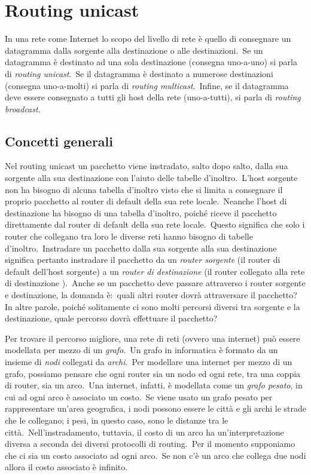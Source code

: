 \section{Routing unicast}

In una rete come Internet lo scopo del livello di rete è quello di consegnare un datagramma dalla sorgente alla destinazione o alle destinazioni.\
Se un datagramma è destinato ad una sola destinazione (consegna uno-a-uno) si parla di \emph{routing unicast}.\
Se il datagramma è destinato a numerose destinazioni (consegna uno-a-molti) si parla di \emph{routing multicast}.\
Infine, se il datagramma deve essere consegnato a tutti gli host della rete (uno-a-tutti), si parla di \emph{routing broadcast}.

\subsection{Concetti generali}

Nel routing unicast un pacchetto viene instradato, salto dopo salto, dalla sua sorgente alla sua destinazione con l'aiuto delle tabelle d'inoltro.\
L'host sorgente non ha bisogno di alcuna tabella d'inoltro visto che si limita a consegnare il proprio pacchetto al router di default della sua rete locale.\
Neanche l'host di destinazione ha bisogno di una tabella d'inoltro, poiché riceve il pacchetto direttamente dal router di default della sua rete locale.\
Questo significa che solo i router che collegano tra loro le diverse reti hanno bisogno di tabelle d'inoltro.\
Instradare un pacchetto dalla sua sorgente alla sua destinazione significa pertanto instradare il pacchetto da un \emph{router sorgente} (il router di default dell'host sorgente) a un \emph{router di destinazione} (il router collegato alla rete di destinazione ).\
Anche se un pacchetto deve passare attraverso i router sorgente e destinazione, la domanda è:\ quali altri router dovrà attraversare il pacchetto? In altre parole, poiché solitamente ci sono molti percorsi diversi tra sorgente e la destinazione, quale percorso dovrà effettuare il pacchetto?

Per trovare il percorso migliore, una rete di reti (ovvero una internet) può essere modellata per mezzo di un \emph{grafo}.\
Un grafo in informatica è formato da un insieme di \emph{nodi} collegati da \emph{archi}.\
Per modellare una internet per mezzo di un grafo, possiamo pensare che ogni router sia un nodo ed ogni rete, tra una coppia di router, sia un arco.\
Una internet, infatti, è modellata come un \emph{grafo pesato}, in cui ad ogni arco è associato un costo.\
Se viene usato un grafo pesato per rappresentare un'area geografica, i nodi possono essere le città e gli archi le strade che le collegano; i pesi, in questo caso, sono le distanze tra le città.\
Nell'instradamento, tuttavia, il costo di un arco ha un'interpretazione diversa a seconda dei diversi protocolli di routing.\
Per il momento supponiamo che ci sia un costo associato ad ogni arco.\
Se non c'è un arco che collega due nodi allora il costo associato è infinito.

